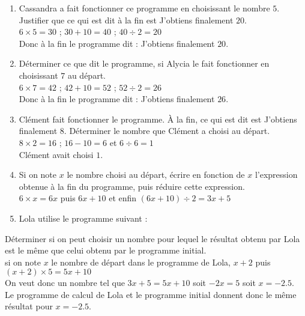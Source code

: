 \begin{corrige}
    \begin{enumerate}
        \item Cassandra a fait fonctionner ce programme en choisissant le nombre $5$. Justifier que ce qui est dit à la fin est \og J'obtiens finalement $20$\fg{}.\\
        {\red $6\times 5 =30$ ; $30+10 = 40$ ; $40\div 2 = 20$\\
        Donc à la fin le programme dit : \og J'obtiens finalement $20$\fg{}.
        }\\
        \item Déterminer ce que dit le programme, si Alycia le fait fonctionner en choisissant $7$ au départ.\\
        {\red $6\times 7 = 42$ ; $42+10 = 52$ ; $52\div 2 = 26$\\
        Donc à la fin le programme dit : \og J'obtiens finalement $26$\fg{}.
        }\\
        \item Clément fait fonctionner le programme. À la fin, ce qui est dit est \og J'obtiens finalement $8$\fg{}. Déterminer le nombre que Clément a choisi au départ.\\
        {\red $8\times 2 = 16$ ; $16-10=6$ et $6\div 6=1$\\ Clément avait choisi $1$.}\\
        \item Si on note $x$ le nombre choisi au départ, écrire en fonction de $x$ l'expression obtenue à la fin du programme, puis réduire cette expression.\\
        {\red $6\times x =6x$ puis $6x+10$ et enfin $(6x+10)\div 2 = 3x+5$}\\
        \item Lola utilise le programme suivant :
    \end{enumerate}
    \begin{minipage}{1\linewidth}
    \end{minipage}
\Coupe
    Déterminer si on peut choisir un nombre pour lequel le résultat obtenu par Lola est le même que celui obtenu par le programme initial.\\
    {\red si on note $x$ le nombre de départ dans le programme de Lola, $x+2$ puis $(x+2)\times5=5x+10$\\
    On veut donc un nombre tel que $3x+5=5x+10$ soit $-2x=5$ soit $x=\num{-2.5}$.\\
    Le programme de calcul de Lola et le programme initial donnent donc le même résultat pour $x=\num{-2.5}$.
    }
\end{corrige}

